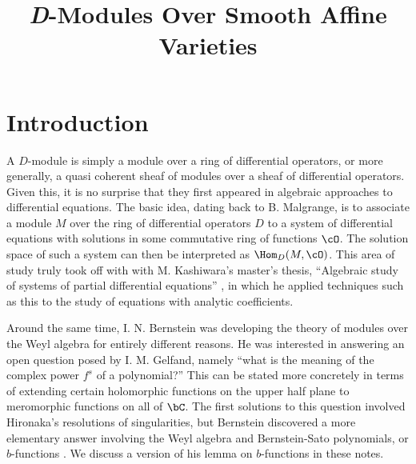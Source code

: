 
\usepackage{indentfirst}

\title{\textit{D}-Modules Over Smooth Affine Varieties}
\date{}

\usepackage{titling}
\renewcommand\maketitlehooka{\null\mbox{}\vfill}
\renewcommand\maketitlehookd{\vfill\null}

\setcounter{page}{2}
\maketitle

\newpage

\tableofcontents
\newpage
\section*{Introduction}

A $D$-module is simply a module over a ring of differential operators, or more generally, a quasi coherent sheaf of modules over a sheaf of differential operators. Given this, it is no surprise that they first appeared in algebraic approaches to differential equations. The basic idea, dating back to B. Malgrange, is to associate a module $M$ over the ring of differential operators $D$ to a system of differential equations with solutions in some commutative ring of functions $\cO$. The solution space of such a system can then be interpreted as $\Hom_D(M,\cO)$. This area of study truly took off with with M. Kashiwara's master's thesis, ``Algebraic study of systems of partial differential equations'' \cite{kashiwara-m_master-thesis}, in which he applied techniques such as this to the study of equations with analytic coefficients. 

Around the same time, I. N. Bernstein was developing the theory of modules over the Weyl algebra for entirely different reasons. He was interested in answering an open question posed by I. M. Gelfand, namely ``what is the meaning of the complex power $f^s$ of a polynomial?'' This can be stated more concretely in terms of extending certain holomorphic functions on the upper half plane to meromorphic functions on all of $\bC$. The first solutions to this question involved Hironaka's resolutions of singularities, but Bernstein discovered a more elementary answer involving the Weyl algebra and Bernstein-Sato polynomials, or $b$-functions \cite{bernstein-j_og-b-function}. We discuss a version of his lemma on $b$-functions in these notes.

